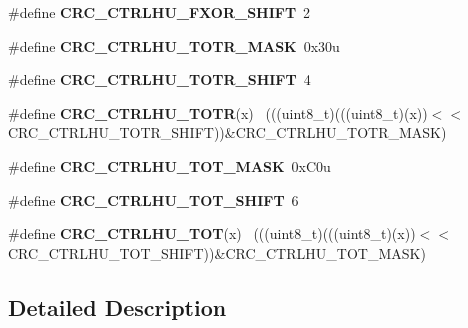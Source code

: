 \begin{DoxyCompactItemize}
\item 
\hypertarget{group___c_r_c___register___masks_ga505ca51d1aad1610b44bad4580f2637f}{}\#define {\bfseries C\+R\+C\+\_\+\+C\+T\+R\+L\+H\+U\+\_\+\+F\+X\+O\+R\+\_\+\+S\+H\+I\+F\+T}~2\label{group___c_r_c___register___masks_ga505ca51d1aad1610b44bad4580f2637f}

\item 
\hypertarget{group___c_r_c___register___masks_ga0418249380c6e69fc9a949f8da4e60f1}{}\#define {\bfseries C\+R\+C\+\_\+\+C\+T\+R\+L\+H\+U\+\_\+\+T\+O\+T\+R\+\_\+\+M\+A\+S\+K}~0x30u\label{group___c_r_c___register___masks_ga0418249380c6e69fc9a949f8da4e60f1}

\item 
\hypertarget{group___c_r_c___register___masks_ga991fefda83335d188d0cc82f1e64f43e}{}\#define {\bfseries C\+R\+C\+\_\+\+C\+T\+R\+L\+H\+U\+\_\+\+T\+O\+T\+R\+\_\+\+S\+H\+I\+F\+T}~4\label{group___c_r_c___register___masks_ga991fefda83335d188d0cc82f1e64f43e}

\item 
\hypertarget{group___c_r_c___register___masks_ga90b299bcced60b8b784350afac4da6dc}{}\#define {\bfseries C\+R\+C\+\_\+\+C\+T\+R\+L\+H\+U\+\_\+\+T\+O\+T\+R}(x)                                          ~(((uint8\+\_\+t)(((uint8\+\_\+t)(x))$<$$<$C\+R\+C\+\_\+\+C\+T\+R\+L\+H\+U\+\_\+\+T\+O\+T\+R\+\_\+\+S\+H\+I\+F\+T))\&C\+R\+C\+\_\+\+C\+T\+R\+L\+H\+U\+\_\+\+T\+O\+T\+R\+\_\+\+M\+A\+S\+K)\label{group___c_r_c___register___masks_ga90b299bcced60b8b784350afac4da6dc}

\item 
\hypertarget{group___c_r_c___register___masks_gac2999b1c162cd0860f76f002ead704ad}{}\#define {\bfseries C\+R\+C\+\_\+\+C\+T\+R\+L\+H\+U\+\_\+\+T\+O\+T\+\_\+\+M\+A\+S\+K}~0x\+C0u\label{group___c_r_c___register___masks_gac2999b1c162cd0860f76f002ead704ad}

\item 
\hypertarget{group___c_r_c___register___masks_ga079a05fc69d357e3fadfb07de8abbeee}{}\#define {\bfseries C\+R\+C\+\_\+\+C\+T\+R\+L\+H\+U\+\_\+\+T\+O\+T\+\_\+\+S\+H\+I\+F\+T}~6\label{group___c_r_c___register___masks_ga079a05fc69d357e3fadfb07de8abbeee}

\item 
\hypertarget{group___c_r_c___register___masks_ga7ac4af4df4f785bf6205fd8e6118f28b}{}\#define {\bfseries C\+R\+C\+\_\+\+C\+T\+R\+L\+H\+U\+\_\+\+T\+O\+T}(x)                                            ~(((uint8\+\_\+t)(((uint8\+\_\+t)(x))$<$$<$C\+R\+C\+\_\+\+C\+T\+R\+L\+H\+U\+\_\+\+T\+O\+T\+\_\+\+S\+H\+I\+F\+T))\&C\+R\+C\+\_\+\+C\+T\+R\+L\+H\+U\+\_\+\+T\+O\+T\+\_\+\+M\+A\+S\+K)\label{group___c_r_c___register___masks_ga7ac4af4df4f785bf6205fd8e6118f28b}

\end{DoxyCompactItemize}


\subsection{Detailed Description}
